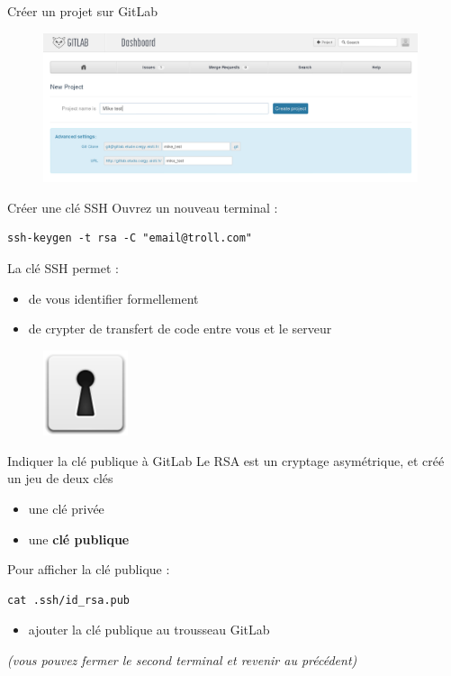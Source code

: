 \documentclass{beamer}
\begin{document}
\begin{frame}{Créer un projet sur GitLab}
	\begin{figure}
  		\centering
 		\includegraphics[width=11cm]{img/shot12}
	\end{figure}
\end{frame}

\begin{frame}[fragile]{Créer une clé SSH}
	Ouvrez un nouveau terminal :
	\begin{lstlisting}[frame=single]
		ssh-keygen -t rsa -C "email@troll.com"
	\end{lstlisting}
	
	La clé SSH permet :
	\begin{itemize}
		\item de vous identifier formellement
		\item de crypter de transfert de code entre vous et le serveur
	\end{itemize}
	\begin{figure}
  		\centering
 		\includegraphics[height=2.5cm]{img/keyhole}
	\end{figure}
\end{frame}

\begin{frame}[fragile]{Indiquer la clé publique à GitLab}
	Le RSA est un cryptage asymétrique, et créé un jeu de deux clés
	\begin{itemize}
		\item une clé privée
		\item une \textbf{clé publique}
	\end{itemize}
	
	Pour afficher la clé publique :
	\begin{lstlisting}[frame=single]
		cat .ssh/id_rsa.pub
	\end{lstlisting}
	\begin{itemize}
		\item ajouter la clé publique au trousseau GitLab
	\end{itemize}		
	\begin{center}
		\textit{(vous pouvez fermer le second terminal et revenir au précédent)}
	\end{center}
\end{frame}
\end{document}
